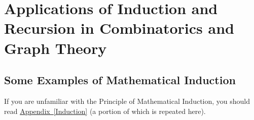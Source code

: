 \documentclass[10pt,]{book}
\theoremstyle{plain}
\theoremstyle{definition}
\theoremstyle{definition}
\numberwithin{equation}{chapter}
\begin{document}
\chapter[{Applications of Induction and Recursion in Combinatorics and Graph Theory}]{Applications of Induction and Recursion in Combinatorics and Graph Theory}\label{InductionRecursion}
\typeout{************************************************}
\typeout{************************************************}
\section[{Some Examples of Mathematical Induction}]{Some Examples of Mathematical Induction}\label{sec_induction-examples}
If you are unfamiliar with the Principle of Mathematical Induction, you should read \hyperref[Induction]{Appendix~\ref{Induction}} (a portion of which is repeated here).%
\typeout{************************************************}
\typeout{************************************************}
\end{document}

